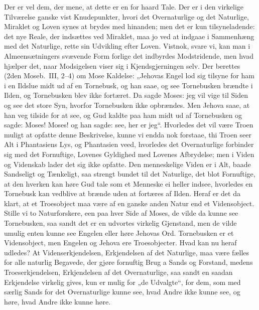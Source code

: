 \documentclass[12pt,a4paper]{article}
\newcommand{\opage}[1]{\marginnote{\footnotesize\textit{[#1]}}}
\begin{document}
Der er vel dem, der mene, at dette er en for haard Tale. Der er i den
virkelige Tilværelse ganske vist Knudepunkter, hvori det Overnaturlige
og det Naturlige, Miraklet og Loven synes at brydes med hinanden; men
det er kun tilsyneladende: det nye Reale, der indsættes ved Miraklet,
maa jo ved at indgaae i Sammenhæng med det Naturlige, rette sin
Udvikling efter Loven. Vistnok, svare vi, kan man i Almeensætningers
svævende Form forlige det indbyrdes Modstridende, men hvad hjælper det,
naar Modsigelsen viser sig i Kjendsgjerningen selv. Der berettes (2den
Moseb.\ III, 2--4) om Mose Kaldelse: „Jehovas Engel lod sig tilsyne
for ham i en Ildslue midt ud af en Tornebusk, og han saae, og see
Tornebusken brændte i Ilden, og Tornebusken blev ikke fortæret. Da
sagde Moses: jeg vil vige til Siden og see det store Syn, hvorfor
Tornebusken ikke opbrændes. Men Jehova saae, at han veg tilside for at
see, og Gud kaldte paa ham midt ud af Tornebusken og sagde: Moses!
Moses! og han sagde: see, her er jeg“. Hvorledes det vil være Troen
muligt at opfatte denne Beskrivelse, kunne vi endda nok forstaae, thi
Troen seer Alt i Phantasiens Lys, og Phantasien veed, hvorledes det
Overnaturlige forbinder sig med det Fornuftige, Lovenes Gyldighed med
Lovenes Afbrydelse; men i Viden og Videnskab lader det sig ikke
opfatte. Den menneskelige Viden er i Alt, baade Sandseligt og
Tænkeligt, saa strengt bundet til det Naturlige, det blot Fornuftige,
at den hverken kan høre Gud tale som et Menneske ei heller indsee,
hvorledes en Tornebusk kan vedblive at brænde uden at fortæres af
Ilden. Heraf er det da klart, at et Troesobject maa være af en ganske
anden Natur end et Vidensobject. Stille vi to Naturforskere, een paa
hver Side af Moses, de vilde da kunne see Tornebusken, saa sandt det er
en udvortes virkelig Gjenstand, men de vilde umulig enten kunne see
Engelen eller høre Jehovas Ord. Tornebusken er et Vidensobject, men
Engelen og Jehova ere Troesobjecter.
Hvad kan nu heraf udledes? At Videnserkjendelsen, Erkjendelsen af det
Naturlige, maa være \opage{8} fælles for alle naturlig Begavede, der gjøre
fornuftig Brug a %
Sands og Forstand, medens Troeserkjendelsen,
Erkjendelsen af det Overnaturlige, saa sandt en saadan Erkjendelse
virkelig gives, kun er mulig for „de Udvalgte“, for dem, som med særlig
Sands for det Overnaturlige kunne see, hvad Andre ikke kunne see, og
høre, hvad Andre ikke kunne høre.
\end{document}
